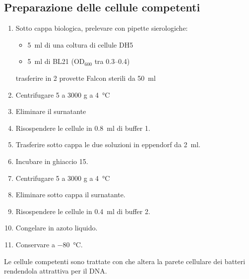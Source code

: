 \subsection{Preparazione delle cellule competenti}
\begin{enumerate}
	\item Sotto cappa biologica, prelevare con pipette sierologiche:
	\begin{itemize}
		\item \qty{5}{\ml} di una coltura di cellule DH5\textalpha
		\item \qty{5}{\ml} di BL21 (\(\text{OD}_{600}\) tra \numrange{0.3}{0.4}) 
	\end{itemize}
	trasferire in 2 provette Falcon sterili da \qty{50}{\ml} 
	\item Centrifugare \qty{5}{\min} a 3000 g a \qty{4}{\celsius}
	\item Eliminare il surnatante
	\item Risospendere le cellule in \qty{0.8}{\ml} di buffer 1.
	\item Trasferire sotto cappa le due soluzioni in eppendorf da \qty{2}{\ml}.
	\item Incubare in ghiaccio \qty{15}{\min}.
	\item Centrifugare \qty{5}{\min} a 3000 g a \qty{4}{\celsius}
	\item Eliminare sotto cappa il surnatante.
	\item Risospendere le cellule in \qty{0.4}{\ml} di buffer 2.
	\item Congelare in azoto liquido.
	\item Conservare a \qty{-80}{\celsius}.
\end{enumerate}
Le cellule competenti sono trattate con  che altera la parete cellulare dei batteri rendendola attrattiva per il DNA.




\begingroup
	\newpage

	\vspace*{0.5cm}
\endgroup